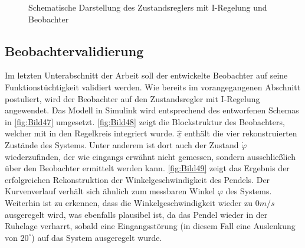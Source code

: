 \begin{figure}[H]
    \centering
    \caption[Reglerstruktur mit Beobachter]{Schematische Darstellung des Zustandsreglers mit I-Regelung und Beobachter}
    \label{fig:Bild47}
\end{figure}

\subsection{Beobachtervalidierung}

Im letzten Unterabschnitt der Arbeit soll der entwickelte Beobachter auf seine Funktionstüchtigkeit validiert werden. Wie bereits im vorangegangenen Abschnitt postuliert, wird der Beobachter auf den Zustandsregler mit I-Regelung angewendet. Das Modell in Simulink wird entsprechend des entworfenen Schemas in \autoref{fig:Bild47} umgesetzt. \autoref{fig:Bild48} zeigt die Blockstruktur des Beobachters, welcher mit in den Regelkreis integriert wurde. $\underline{\hat{x}}$ enthält die vier rekonstruierten Zustände des Systems. Unter anderem ist dort auch der Zustand $\dot{\varphi}$ wiederzufinden, der wie eingangs erwähnt nicht gemessen, sondern ausschließlich über den Beobachter ermittelt werden kann. \autoref{fig:Bild49} zeigt das Ergebnis der erfolgreichen Rekonstruktion der Winkelgeschwindigkeit des Pendels. Der Kurvenverlauf verhält sich ähnlich zum messbaren Winkel $\varphi$ des Systems. Weiterhin ist zu erkennen, dass die Winkelgeschwindigkeit wieder zu $0 m/s$ ausgeregelt wird, was ebenfalls plausibel ist, da das Pendel wieder in der Ruhelage verharrt, sobald eine Eingangsstörung (in diesem Fall eine Auslenkung von $20^\circ$) auf das System ausgeregelt wurde.

